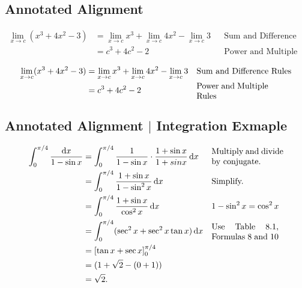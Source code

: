 \documentclass{article}
\begin{document}
	
	\subsection*{Annotated Alignment}
	\begin{align*}
		\lim_{x\to c}(x^3 + 4x^2 - 3) &= \lim_{x\to c}x^3 + \lim_{x\to c}4x^2 - \lim_{x\to c} 3  && \text{Sum and Difference Rules}\\
			&= c^3 + 4c^2 - 2 && \text{Power and Multiple Rules}
	\end{align*}
	
	\begin{align*}
		\lim_{x\to c}(x^3 + 4x^2 - 3) &= \lim_{x\to c}x^3 + \lim_{x\to c}4x^2 - \lim_{x\to c} 3  && \text{Sum and Difference Rules}\\
		&= c^3 + 4c^2 - 2 && \text{\parbox{3cm}{Power and Multiple Rules}}
	\end{align*}


	\subsection*{Annotated Alignment $\vert$ Integration Exmaple}
	\begin{align*}
		\int_{0}^{\pi/4} \frac{\dif x}{1-\sin{x}} &= \int_{0}^{\pi/4} \frac{1}{1-\sin{x}} \cdot \frac{1 + \sin{x}}{1 + sin{x}} \dif x && \text{\parbox{3cm}{Multiply and divide by conjugate.}} \\
			&= \int_{0}^{\pi/4} \frac{1 + \sin{x}}{1- \sin^2{x}} \dif x && \text{Simplify.}\\
			&= \int_{0}^{\pi/4} \frac{1 + \sin{x}}{\cos^2{x}} \dif x && 1 - \sin^2{x} = \cos^2{x} \\
			&= \int_{0}^{\pi/4} (\sec^2{x} + \sec^2{x} \tan{x}) \dif x && \text{\parbox{2.8cm}{Use Table 8.1, Formulas 8 and 10}}\\
			&= \left[ \tan{x} + \sec{x} \right]_{0}^{\pi/4} \\
			&= ( 1 + \sqrt{2} - (0 + 1)) \\
			&= \sqrt{2}.
	\end{align*}
	
\end{document}
